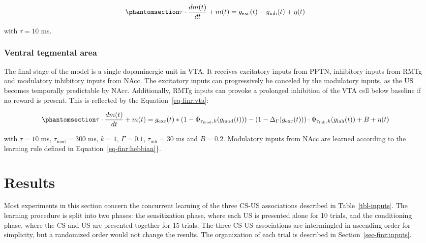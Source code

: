 \documentclass[
  11pt,
  a4paper,
]{scrbook}
\begin{document}
\begin{equation}\phantomsection\label{eq-finr:rmtg}{
    \tau \cdot \frac{dm(t)}{dt} +  m(t) = g_{\text{exc}}(t) - g_{\text{inh}}(t) + \eta(t)
}\end{equation}

with \(\tau= 10\) ms.

\subsubsection*{Ventral tegmental area}\label{ventral-tegmental-area}

The final stage of the model is a single dopaminergic unit in VTA. It
receives excitatory inputs from PPTN, inhibitory inputs from RMTg and
modulatory inhibitory inputs from NAcc. The excitatory inputs can
progressively be canceled by the modulatory inputs, as the US becomes
temporally predictable by NAcc. Additionally, RMTg inputs can provoke a
prolonged inhibition of the VTA cell below baseline if no reward is
present. This is reflected by the Equation~\ref{eq-finr:vta}:

\begin{equation}\phantomsection\label{eq-finr:vta}{
    \tau \cdot \frac{dm(t)}{dt} +  m(t) = g_{\text{exc}}(t) * (1- \Phi_{\tau_{\text{mod}}, k}(g_{\text{mod}}(t)))- (1- \Delta_{\Gamma}(g_{\text{exc}}(t))) \cdot \Phi_{\tau_{\text{inh}}, k}(g_{\text{inh}}(t)) + B + \eta(t)
}\end{equation}

with \(\tau=10\) ms, \(\tau_{\text{mod}}=300\) ms, \(k=1\),
\(\Gamma=0.1\), \(\tau_{\text{inh}}=30\) ms and \(B=0.2\). Modulatory
inputs from NAcc are learned according to the learning rule defined in
Equation~\ref{eq-finr:hebbian}\}.

\section{Results}\label{results-3}

Most experiments in this section concern the concurrent learning of the
three CS-US associations described in Table~\ref{tbl-inputs}. The
learning procedure is split into two phases: the sensitization phase,
where each US is presented alone for 10 trials, and the conditioning
phase, where the CS and US are presented together for 15 trials. The
three CS-US associations are intermingled in ascending order for
simplicity, but a randomized order would not change the results. The
organization of each trial is described in
Section~\ref{sec-finr:inputs}.
\end{document}
